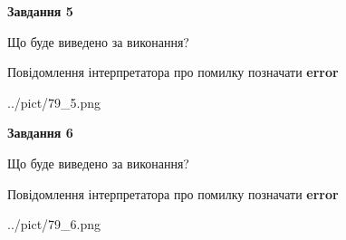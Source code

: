 \documentclass[12pt, ukrainian]{article}
\begin{document}
{{\begin {center}\textbf{Завдання 5}\end {center}}\par
Що буде виведено за виконання? \par
Повідомлення інтерпретатора про помилку позначати \textbf{error}

\begin{center}
	{../pict/79_5.png}
\end{center}
\newpage

{\begin {center}\textbf{Завдання 6}\end {center}}\par
Що буде виведено за виконання? \par
Повідомлення інтерпретатора про помилку позначати \textbf{error}

\begin{center}
	{../pict/79_6.png}
\end{center}
\newpage

}
\end{document}
